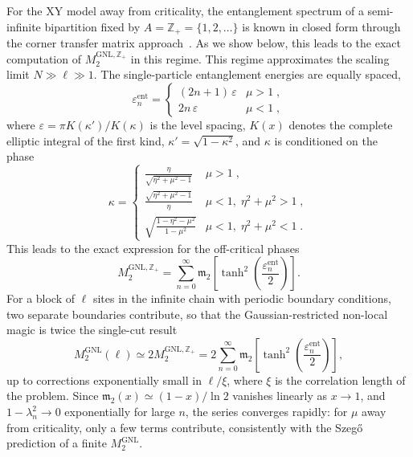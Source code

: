 \documentclass[prx,twocolumn,superscriptaddress,aps,10pt, frontmatterverbose, reprint,footinbib,longbibliography=true]{revtex4-2}
\begin{document}
For the XY model away from criticality, the entanglement spectrum of a semi-infinite bipartition fixed by $A=\mathbb{Z}_+=\{1,2,\dots\}$ is known in closed form through the corner transfer matrix approach~\cite{Peschel2009,Eisler2017}.
As we show below, this leads to the exact computation of $M_2^\mathrm{GNL,\mathbb{Z}_+}$ in this regime. 
This regime approximates the scaling limit $N\gg\ell\gg1$.
The single-particle entanglement energies are equally spaced,
\begin{equation}
    \varepsilon_n^{\mathrm{ent}} = \begin{cases}
        (2n+1)\,\varepsilon & \mu > 1 \;,\\
        2n\,\varepsilon & \mu < 1 \;,
    \end{cases}
    \label{eq:peschel_spectrum}
\end{equation}
where $\varepsilon = \pi K(\kappa')/K(\kappa)$ is the level spacing, $K(x)$ denotes the complete elliptic integral of the first kind, $\kappa' = \sqrt{1-\kappa^2}$, and $\kappa$ is conditioned on the phase~\cite{Peschel2009}
\begin{equation}
    \kappa = \begin{cases}
        \displaystyle\frac{\eta}{\sqrt{\eta^2 + \mu^2 - 1}} & \mu > 1 \;,\\[8pt]
        \displaystyle\frac{\sqrt{\eta^2 + \mu^2 - 1}}{\eta} & \mu < 1,\; \eta^2 + \mu^2 > 1\;,\\[8pt]
        \displaystyle\sqrt{\frac{1 - \eta^2 - \mu^2}{1 - \mu^2}} & \mu < 1,\; \eta^2 + \mu^2 < 1\;.
    \end{cases}
    \label{eq:elliptic_modulus}
\end{equation}
This leads to the exact expression for the off-critical phases
\begin{equation}
    M_2^{\mathrm{GNL},\mathbb{Z}_+} = \sum_{n=0}^{\infty} \mathfrak{m}_2\!\left[\tanh^2\left(\frac{\varepsilon_n^{\mathrm{ent}}}{2}\right)\right].
    \label{eq:NL_peschel}
\end{equation}
For a block of $\ell$ sites in the infinite chain with periodic boundary conditions, two separate boundaries contribute, so that the Gaussian-restricted non-local magic is twice the single-cut result
\begin{equation}
    M_2^{\mathrm{GNL}}(\ell) \simeq  2M_2^{\mathrm{GNL},\mathbb{Z}_+} = 2\sum_{n=0}^{\infty} \mathfrak{m}_2\!\left[\tanh^2\left(\frac{\varepsilon_n^{\mathrm{ent}}}{2}\right)\right],
    \label{eq:NL_peschel2}
\end{equation}
up to corrections exponentially small in $\ell/\xi$, where $\xi$ is the correlation length of the problem. 
Since $\mathfrak{m}_2(x)\simeq(1-x)/\ln 2$ vanishes linearly as $x \to 1$, and $1-\lambda_n^2 \to 0$ exponentially for large $n$, the series converges rapidly: for $\mu$ away from criticality, only a few terms contribute, consistently with the Szeg\H{o} prediction of a finite $M_2^{\mathrm{GNL}}$.
\end{document}

